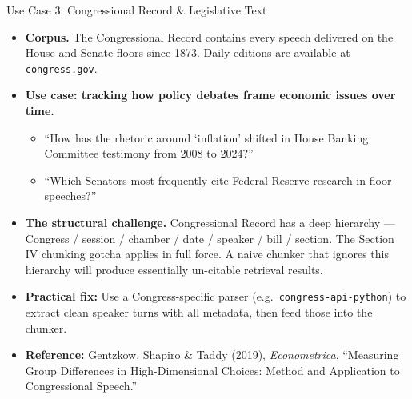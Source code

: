 \begin{frame}{Use Case 3: Congressional Record \& Legislative Text}
\begin{itemize}
\item \textbf{Corpus.} The Congressional Record contains every speech delivered on the House and Senate floors since 1873. Daily editions are available at \texttt{congress.gov}.

\medskip
\item \textbf{Use case: tracking how policy debates frame economic issues over time.}
\begin{itemize}
    \item ``How has the rhetoric around `inflation' shifted in House Banking Committee testimony from 2008 to 2024?''
    \item ``Which Senators most frequently cite Federal Reserve research in floor speeches?''
\end{itemize}

\medskip
\item \textbf{The structural challenge.} Congressional Record has a deep hierarchy --- Congress / session / chamber / date / speaker / bill / section. The Section IV chunking gotcha applies in full force. A naive chunker that ignores this hierarchy will produce essentially un-citable retrieval results.

\medskip
\item \textbf{Practical fix:} Use a Congress-specific parser (e.g.\ \texttt{congress-api-python}) to extract clean speaker turns with all metadata, then feed those into the chunker.

\medskip
\item \textbf{Reference:} Gentzkow, Shapiro \& Taddy (2019), \emph{Econometrica}, ``Measuring Group Differences in High-Dimensional Choices: Method and Application to Congressional Speech.''
\end{itemize}
\end{frame}

